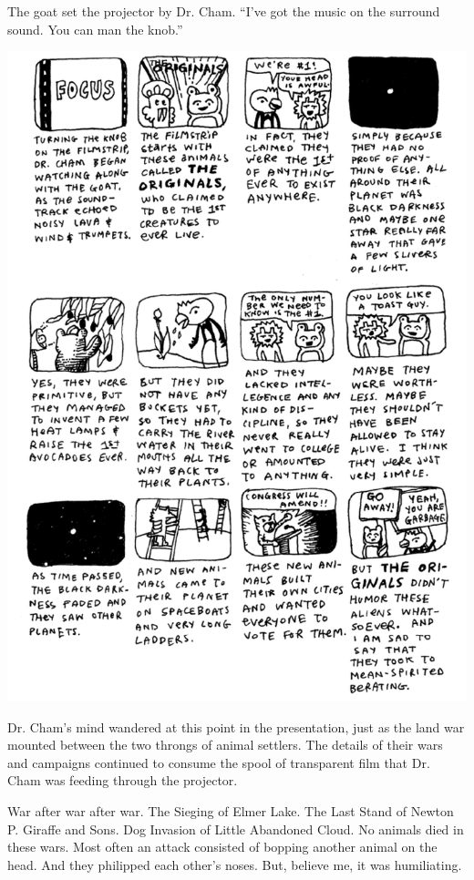 \documentclass[10pt,twoside]{report}
\begin{document}
The goat set the projector by Dr. Cham.  ``I've got the music on the
surround sound. You can man the knob.''

	\includegraphics[width=1.0\textwidth]{cache/45.png}

Dr. Cham's mind wandered at this point in the presentation, just as
the land war mounted between the two throngs of animal settlers.  The
details of their wars and campaigns continued to consume the spool of
transparent film that Dr. Cham was feeding through the projector.

War after war after war.  The Sieging of Elmer Lake.  The Last Stand
of Newton P. Giraffe and Sons.  Dog Invasion of Little Abandoned
Cloud.  No animals died in these wars.  Most often an attack consisted
of bopping another animal on the head.  And they philipped each
other's noses.  But, believe me, it was humiliating.
\end{document}
